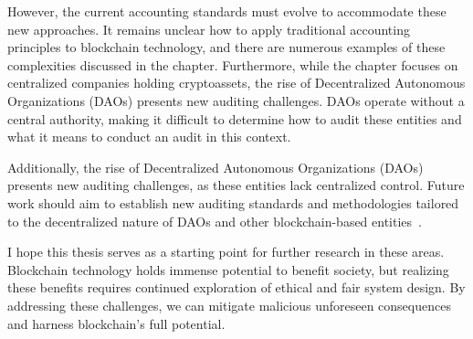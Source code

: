 However, the current accounting standards must evolve to accommodate these new approaches. It remains unclear how to apply traditional accounting principles to blockchain technology, and there are numerous examples of these complexities discussed in the chapter. Furthermore, while the chapter focuses on centralized companies holding cryptoassets, the rise of Decentralized Autonomous Organizations (DAOs) presents new auditing challenges. DAOs operate without a central authority, making it difficult to determine how to audit these entities and what it means to conduct an audit in this context.

Additionally, the rise of Decentralized Autonomous Organizations (DAOs) presents new auditing challenges, as these entities lack centralized control. Future work should aim to establish new auditing standards and methodologies tailored to the decentralized nature of DAOs and other blockchain-based entities~\cite{tan2023open}.


\vspace{10mm}

I hope this thesis serves as a starting point for further research in these areas. Blockchain technology holds immense potential to benefit society, but realizing these benefits requires continued exploration of ethical and fair system design. By addressing these challenges, we can mitigate malicious unforeseen consequences and harness blockchain's full potential.

